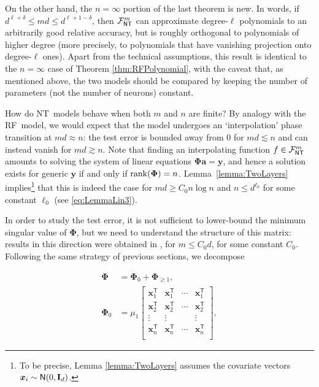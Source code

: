   On the other hand, the $n=\infty$ portion of the last theorem is new. In words, if $d^{\ell+\delta}\le md \le d^{\ell+1-\delta}$, then ${\mathcal F}^m_{\sf NT}$ can approximate degree-$\ell$ polynomials to an arbitrarily good relative accuracy, but is roughly orthogonal to polynomials of higher degree (more precisely, to polynomials that have vanishing projection onto degree-$\ell$ ones). Apart from the technical assumptions, this result is identical to the $n=\infty$ case of Theorem  \ref{thm:RFPolynomial},
  with the caveat that, as mentioned above, the two models should be compared by keeping the number of parameters (not the number of neurons) constant.

  How do {\sf NT}\, models behave when both $m$ and $n$ are finite? By analogy with the {\sf RF}\, model, we would expect that the model undergoes an `interpolation' phase transition at $md\approx n$: the test error is bounded away from $0$ for $md\lesssim n$ and can instead vanish for $md\gtrsim n$. Note that finding an interpolating function $f\in {\mathcal F}^m_{{\sf NT}}$ amounts to solving the system of linear equations
  ${\boldsymbol \Phi}{\boldsymbol a}={\boldsymbol y}$, and hence a solution exists for generic ${\boldsymbol y}$ if and only if ${\rm rank}({\boldsymbol \Phi}) = n$.
  Lemma~\ref{lemma:TwoLayers} implies\footnote{To be precise, Lemma \ref{lemma:TwoLayers} assumes the covariate vectors ${\boldsymbol x}_i\sim{\sf N}(0,{\mathbf I}_d)$.} that this is indeed the case for $md\ge C_0n\log n$ and
  $n\le d^{\ell_0}$ for some constant $\ell_0$ (see \eqref{eq:LemmaLin3}).

  In order to study the test error, it is not sufficient to lower-bound the minimum singular value of ${\boldsymbol \Phi}$, but we need to understand the structure of this matrix: results in this direction were obtained in \cite{montanari2020interpolation}, for $m\le C_0 d$, for some constant $C_0$. Following the same strategy of previous sections, we decompose 

  \begin{align}

    {\boldsymbol \Phi} &= {\boldsymbol \Phi}_0+{\boldsymbol \Phi}_{\ge 1},\\
    {\boldsymbol \Phi}_0& = \mu_1
  \left[\begin{matrix}
 {\boldsymbol x}_1^{{\mathsf T}} &   {\boldsymbol x}_1^{{\mathsf T}} &   \cdots & {\boldsymbol x}_1^{{\mathsf T}} \\
    {\boldsymbol x}_2^{{\mathsf T}} &  {\boldsymbol x}_2^{{\mathsf T}} &   \cdots &{\boldsymbol x}_2^{{\mathsf T}} \\
    \vdots & \vdots& & \vdots\\
    {\boldsymbol x}_n^{{\mathsf T}} & {\boldsymbol x}_n^{{\mathsf T}} &   \cdots & {\boldsymbol x}_n^{{\mathsf T}}\\
  \end{matrix}\right],

  \end{align}

